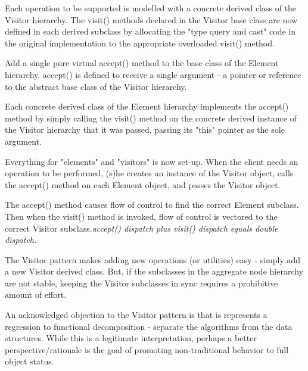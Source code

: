 \documentclass{book}
\begin{document}
Each operation to be supported is modelled with a concrete derived class of the Visitor hierarchy.
The visit() methods declared in the Visitor base class are now defined in each derived subclass by allocating the "type query and cast" code
in the original implementation to the appropriate overloaded visit() method.

Add a single pure virtual accept() method to the base class of the Element hierarchy.
accept() is defined to receive a single argument - a pointer or reference to the abstract base class of the Visitor hierarchy.

Each concrete derived class of the Element hierarchy implements the accept() method by simply calling the visit() method on the concrete 
derived instance of the Visitor hierarchy that it was passed, passing its "this" pointer as the sole argument.

Everything for "elements" and "visitors" is now set-up. When the client needs an operation to be performed, (s)he creates an instance of the Visitor object,
calls the accept() method on each Element object, and passes the Visitor object.

The accept() method causes flow of control to find the correct Element subclass.
Then when the visit() method is invoked, flow of control is vectored to the correct Visitor subclass.\textit{accept() dispatch plus visit() dispatch equals double dispatch.}

The Visitor pattern makes adding new operations (or utilities) easy - simply add a new Visitor derived class.
But, if the subclasses in the aggregate node hierarchy are not stable, keeping the Visitor subclasses in sync requires a prohibitive amount of effort.

An acknowledged objection to the Visitor pattern is that is represents a regression to functional decomposition - separate the algorithms from the data structures.
While this is a legitimate interpretation, perhaps a better perspective/rationale is the goal of promoting non-traditional behavior to full object status.
\end{document}
